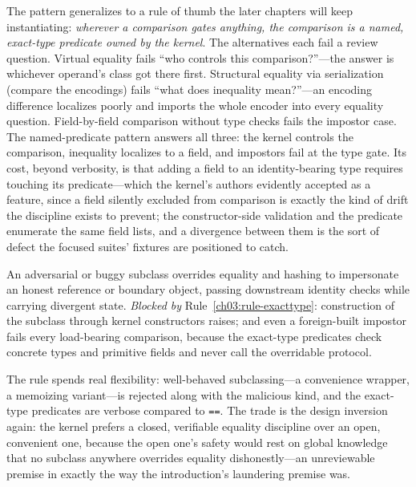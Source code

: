 The pattern generalizes to a rule of thumb the later chapters
will keep instantiating: \emph{wherever a comparison gates
anything, the comparison is a named, exact-type predicate owned by
the kernel}. The alternatives each fail a review question.
Virtual equality fails ``who controls this comparison?''---the
answer is whichever operand's class got there first. Structural
equality via serialization (compare the encodings) fails ``what
does inequality mean?''---an encoding difference localizes poorly
and imports the whole encoder into every equality question.
Field-by-field comparison without type checks fails the impostor
case. The named-predicate pattern answers all three: the kernel
controls the comparison, inequality localizes to a field, and
impostors fail at the type gate. Its cost, beyond verbosity, is
that adding a field to an identity-bearing type requires touching
its predicate---which the kernel's authors evidently accepted as a
feature, since a field silently excluded from comparison is
exactly the kind of drift the discipline exists to prevent; the
constructor-side validation and the predicate enumerate the same
field lists, and a divergence between them is the sort of defect
the focused suites' fixtures are positioned to catch.

\begin{threat}\label{ch03:threat-spoofing}
An adversarial or buggy subclass overrides equality and hashing to
impersonate an honest reference or boundary object, passing
downstream identity checks while carrying divergent state.
\emph{Blocked by} Rule~\ref{ch03:rule-exacttype}: construction of
the subclass through kernel constructors raises; and even a
foreign-built impostor fails every load-bearing comparison, because
the exact-type predicates check concrete types and primitive
fields and never call the overridable protocol.
\end{threat}

\begin{remark}\label{ch03:remark-cost}
The rule spends real flexibility: well-behaved subclassing---a
convenience wrapper, a memoizing variant---is rejected along with
the malicious kind, and the exact-type predicates are verbose
compared to \texttt{==}. The trade is the design inversion again:
the kernel prefers a closed, verifiable equality discipline over
an open, convenient one, because the open one's safety would rest
on global knowledge that no subclass anywhere overrides equality
dishonestly---an unreviewable premise in exactly the way the
introduction's laundering premise was.
\end{remark}

